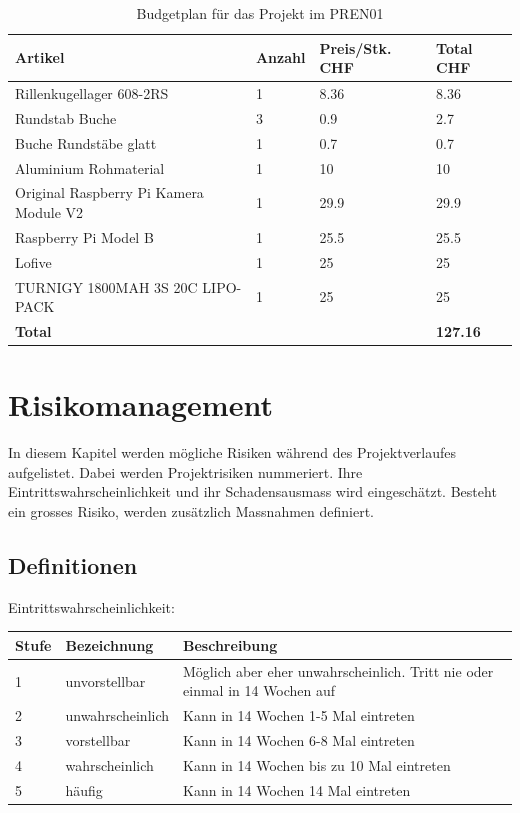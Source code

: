 \documentclass[a4paper]{report}
\begin{document}
\vspace{1em}
\noindent
\begin{table}[h!]
	\begin{tabular}{|p{}|p{}|p{}||p{}|}
		\hline
		\textbf{Artikel} & \textbf{Anzahl} & \textbf{Preis/Stk. CHF} & \textbf{Total CHF} \\
		\hline
		Rillenkugellager 608-2RS & 1 & 8.36 & 8.36 \\
		\hline
		Rundstab Buche & 3 & 0.9 & 2.7 \\
		\hline
		Buche Rundstäbe glatt & 1 & 0.7 & 0.7 \\
		\hline
		Aluminium Rohmaterial & 1 & 10 & 10 \\
		\hline
		Original Raspberry Pi Kamera Module V2 & 1 & 29.9 & 29.9 \\
		\hline
		Raspberry Pi Model B & 1 & 25.5 & 25.5 \\
		\hline
		Lofive & 1 & 25 & 25 \\
		\hline
		TURNIGY 1800MAH 3S 20C LIPO-PACK & 1 & 25 & 25\\
		\hline
		\textbf{Total} & & & \textbf{127.16} \\
		\hline
	\end{tabular}
	\caption{Budgetplan für das Projekt im PREN01}
	\label{tab:Budgetplan}
\end{table}

\section{Risikomanagement}
\label{ch:RisikoMgmt}
In diesem Kapitel werden mögliche Risiken während des Projektverlaufes aufgelistet. Dabei werden Projektrisiken nummeriert. Ihre Eintrittswahrscheinlichkeit und ihr Schadensausmass wird eingeschätzt. Besteht ein grosses Risiko, werden zusätzlich Massnahmen definiert.

\subsection{Definitionen}
\label{sec:Def}
\vspace{1em}
\noindent
Eintrittswahrscheinlichkeit:

\vspace{1em}
\noindent
\begin{tabular}{|p{}|p{}|p{}|}
	\hline
	\textbf{Stufe} & \textbf{Bezeichnung} & \textbf{Beschreibung} \\
	\hline
	1 & unvorstellbar & Möglich aber eher unwahrscheinlich. Tritt nie oder einmal in 14 Wochen auf \\
	\hline
	2 & unwahrscheinlich & Kann in 14 Wochen 1-5 Mal eintreten\\
	\hline
	3 & vorstellbar & Kann in 14 Wochen 6-8 Mal eintreten \\
	\hline
	4 & wahrscheinlich & Kann in 14 Wochen bis zu 10 Mal eintreten \\
	\hline
	5 & häufig & Kann in 14 Wochen 14 Mal eintreten\\
	\hline
\end{tabular}
\end{document}
